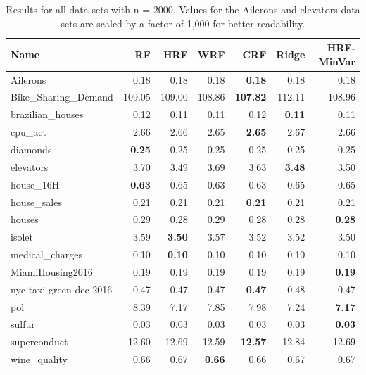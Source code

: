 \begin{table}[ht]
\centering
\begingroup\scriptsize
\begin{tabular}{lrrrrrr}
  \hline
\textbf{ Name } & \textbf{ RF } & \textbf{ HRF } & \textbf{ WRF } & \textbf{ CRF } & \textbf{ Ridge } & \textbf{ HRF-MinVar } \\ 
  \hline
Ailerons & 0.18 & 0.18 & 0.18 & \textbf{0.18} & 0.18 & 0.18 \\ 
  Bike\_Sharing\_Demand & 109.05 & 109.00 & 108.86 & \textbf{107.82} & 112.11 & 108.96 \\ 
  brazilian\_houses & 0.12 & 0.11 & 0.11 & 0.12 & \textbf{0.11} & 0.11 \\ 
  cpu\_act & 2.66 & 2.66 & 2.65 & \textbf{2.65} & 2.67 & 2.66 \\ 
  diamonds & \textbf{0.25} & 0.25 & 0.25 & 0.25 & 0.25 & 0.25 \\ 
  elevators & 3.70 & 3.49 & 3.69 & 3.63 & \textbf{3.48} & 3.50 \\ 
  house\_16H & \textbf{0.63} & 0.65 & 0.63 & 0.63 & 0.65 & 0.65 \\ 
  house\_sales & 0.21 & 0.21 & 0.21 & \textbf{0.21} & 0.21 & 0.21 \\ 
  houses & 0.29 & 0.28 & 0.29 & 0.28 & 0.28 & \textbf{0.28} \\ 
  isolet & 3.59 & \textbf{3.50} & 3.57 & 3.52 & 3.52 & 3.50 \\ 
  medical\_charges & 0.10 & \textbf{0.10} & 0.10 & 0.10 & 0.10 & 0.10 \\ 
  MiamiHousing2016 & 0.19 & 0.19 & 0.19 & 0.19 & 0.19 & \textbf{0.19} \\ 
  nyc-taxi-green-dec-2016 & 0.47 & 0.47 & 0.47 & \textbf{0.47} & 0.48 & 0.47 \\ 
  pol & 8.39 & 7.17 & 7.85 & 7.98 & 7.24 & \textbf{7.17} \\ 
  sulfur & 0.03 & 0.03 & 0.03 & 0.03 & 0.03 & \textbf{0.03} \\ 
  superconduct & 12.60 & 12.69 & 12.59 & \textbf{12.57} & 12.84 & 12.69 \\ 
  wine\_quality & 0.66 & 0.67 & \textbf{0.66} & 0.66 & 0.67 & 0.67 \\ 
   \hline
\end{tabular}
\endgroup
\caption{Results for all data sets with n = 2000. Values for the Ailerons and elevators data sets are scaled by a factor of 1,000 for better readability.} 
\end{table}
